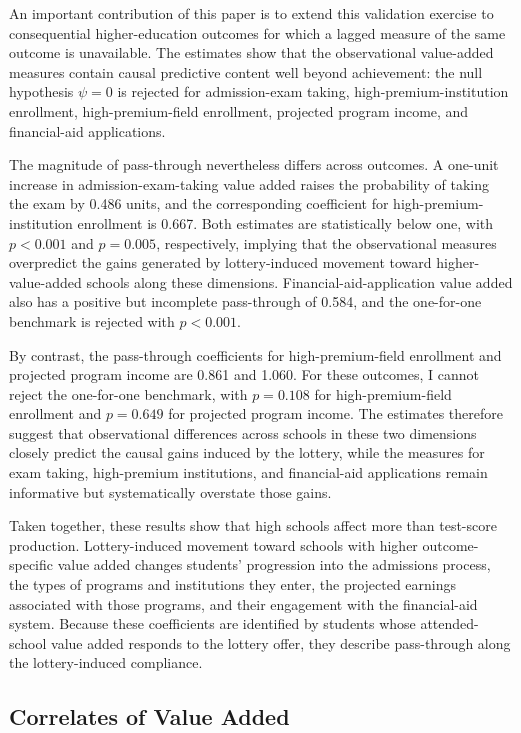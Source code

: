 \documentclass[a4paper, article, english, oneside, unknownkeysallowed, 12pt]{memoir}
\begin{document}
An important contribution of this paper is to extend this validation exercise to consequential higher-education outcomes for which a lagged measure of the same outcome is unavailable.
The estimates show that the observational value-added measures contain causal predictive content well beyond achievement: the null hypothesis $\psi=0$ is rejected for admission-exam taking, high-premium-institution enrollment, high-premium-field enrollment, projected program income, and financial-aid applications.

The magnitude of pass-through nevertheless differs across outcomes.
A one-unit increase in admission-exam-taking value added raises the probability of taking the exam by 0.486 units, and the corresponding coefficient for high-premium-institution enrollment is 0.667.
Both estimates are statistically below one, with $p<0.001$ and $p=0.005$, respectively, implying that the observational measures overpredict the gains generated by lottery-induced movement toward higher-value-added schools along these dimensions.
Financial-aid-application value added also has a positive but incomplete pass-through of 0.584, and the one-for-one benchmark is rejected with $p<0.001$.

By contrast, the pass-through coefficients for high-premium-field enrollment and projected program income are 0.861 and 1.060.
For these outcomes, I cannot reject the one-for-one benchmark, with $p=0.108$ for high-premium-field enrollment and $p=0.649$ for projected program income.
The estimates therefore suggest that observational differences across schools in these two dimensions closely predict the causal gains induced by the lottery, while the measures for exam taking, high-premium institutions, and financial-aid applications remain informative but systematically overstate those gains.

Taken together, these results show that high schools affect more than test-score production.
Lottery-induced movement toward schools with higher outcome-specific value added changes students' progression into the admissions process, the types of programs and institutions they enter, the projected earnings associated with those programs, and their engagement with the financial-aid system.
Because these coefficients are identified by students whose attended-school value added responds to the lottery offer, they describe pass-through along the lottery-induced compliance.


\subsection{Correlates of Value Added}
\end{document}
